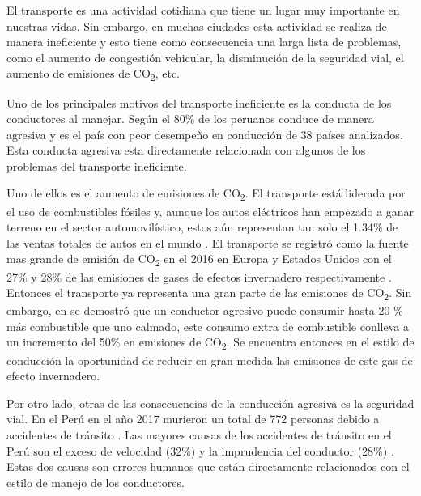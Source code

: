 \begin{introduction}

El transporte es una actividad cotidiana que tiene un lugar muy importante en nuestras vidas. Sin embargo, en muchas ciudades esta actividad se realiza de manera ineficiente y esto tiene como consecuencia una larga lista de problemas, como el aumento de congestión vehicular, la disminución de la seguridad vial, el aumento de emisiones de CO\textsubscript{2}, etc.

Uno de los principales motivos del transporte ineficiente es la conducta de los conductores al manejar. Según \cite{publimetro_2017} el 80\% de los peruanos conduce de manera agresiva y es el país con peor desempeño en conducción de 38 países analizados. Esta conducta agresiva esta directamente relacionada con algunos de los problemas del transporte ineficiente.

Uno de ellos es el aumento de emisiones de CO\textsubscript{2}. El transporte está liderada por el uso de combustibles fósiles y, aunque los autos eléctricos han empezado a ganar terreno en el sector automovilístico, estos aún representan tan solo el 1.34\% de las ventas totales de autos en el mundo \cite{website:EV-sales}. El transporte se registró como la fuente mas grande de emisión de CO\textsubscript{2} en el 2016 en Europa y Estados Unidos con el 27\% y 28\% de las emisiones de gases de efectos invernadero respectivamente \cite{transporte}. Entonces el transporte ya representa una gran parte de las emisiones de CO\textsubscript{2}. Sin embargo, en \cite{7919305} se demostró que un conductor agresivo puede consumir hasta 20 \% más combustible que uno calmado, este consumo extra de combustible conlleva a un incremento del 50\% en emisiones de CO\textsubscript{2}. Se encuentra entonces en el estilo de conducción la oportunidad de reducir en gran medida las emisiones de este gas de efecto invernadero.


Por otro lado, otras de las consecuencias de la conducción agresiva es la seguridad vial. En el Perú en el año 2017 murieron un total de 772 personas debido a accidentes de tránsito \cite{website:El-comercio}. Las mayores causas de los accidentes de tránsito en el Perú son el exceso de velocidad (32\%) y la imprudencia del conductor (28\%) \cite{website:PNP-accidentes}. Estas dos causas son errores humanos que están directamente relacionados con el estilo de manejo de los conductores.


\end{introduction}
